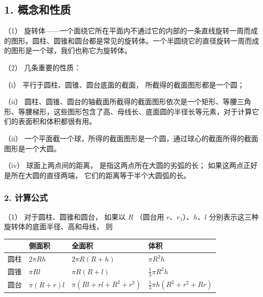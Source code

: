 \subsection{1. 概念和性质}

（1）
旋转体------一个面绕它所在平面内不通过它的内部的一条直线旋转一周而成的图形。圆柱、圆锥和圆台都是常见的旋转体。一个半圆绕它的直径旋转一周而成的图形是一个球，我们也称它为旋转体。

（2） 几条重要的性质：

（i） 平行于圆柱、圆锥、圆台底面的截面， 所截得的截面图形都是一个圆；

（ii）
圆柱、圆锥、圆台的轴截面所截得的截面图形依次是一个矩形、等腰三角形、等腰梯形，这些图形包含了高、母线长、底面圆的半径长等元素，对于计算它们的表面积和体积都很有用。

（ii）
一个平面截一个球，所得的截面图形是一个圆，通过球心的截面所得的截面图形是一个大圆。

（iv） 球面上两点间的距离， 是指这两点所在大圆的劣弧的长；
如果这两点正好是所在大圆的直径两端， 它们的距离等于半个大圆弧的长。

\subsubsection{2. 计算公式}

（1） 对于圆柱、圆锥和圆台， 如果以 \(R\) （圆台用
\(r\)、\(r_1\)）、\(h\)、\(l\)
分别表示这三种旋转体的底面半径、高和母线， 则

{\def\LTcaptype{none} %
\begin{longtable}[]{@{}
  >{\raggedright\arraybackslash}p{}
  >{\raggedright\arraybackslash}p{}
  >{\raggedright\arraybackslash}p{}
  >{\raggedright\arraybackslash}p{}@{}}
\toprule\noalign{}
\begin{minipage}[b]{\linewidth}\raggedright
\end{minipage} & \begin{minipage}[b]{\linewidth}\raggedright
侧面积
\end{minipage} & \begin{minipage}[b]{\linewidth}\raggedright
全面积
\end{minipage} & \begin{minipage}[b]{\linewidth}\raggedright
体积
\end{minipage} \\
\midrule\noalign{}
\endhead
\bottomrule\noalign{}
\endlastfoot
圆柱 & \(2\pi Rh\) & \(2\pi R(R+h)\) & \(\pi R^{2}h\) \\
圆锥 & \(\pi Rl\) & \(\pi R(R+l)\) & \(\frac{1}{3}\pi R^{2}h\) \\
圆台 & \(\pi(R+r)l\) & \(\pi(Rl+rl+R^{2}+r^{2})\) &
\(\frac{1}{3}\pi h(R^{2}+r^{2}+Rr)\) \\
\end{longtable}
}


